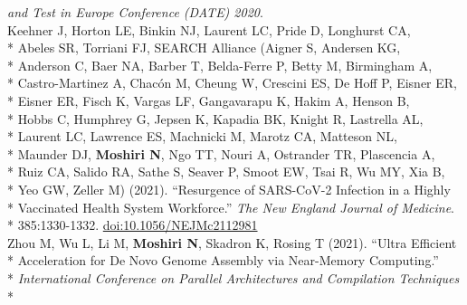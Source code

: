 \documentclass[margin,line]{res}
\begin{document}
\begin{resume}
\hspace*{8mm} \textit{and Test in Europe Conference (DATE) 2020}.\\
\hspace*{4mm} Keehner J, Horton LE, Binkin NJ, Laurent LC, Pride D, Longhurst CA,\\*
\hspace*{9mm} Abeles SR, Torriani FJ, SEARCH Alliance (Aigner S, Andersen KG,\\*
\hspace*{9mm} Anderson C, Baer NA, Barber T, Belda-Ferre P, Betty M, Birmingham A,\\*
\hspace*{9mm} Castro-Martinez A, Chac\'on M, Cheung W, Crescini ES, De Hoff P, Eisner ER,\\*
\hspace*{9mm} Eisner ER, Fisch K, Vargas LF, Gangavarapu K, Hakim A, Henson B,\\*
\hspace*{9mm} Hobbs C, Humphrey G, Jepsen K, Kapadia BK, Knight R, Lastrella AL,\\*
\hspace*{9mm} Laurent LC, Lawrence ES, Machnicki M, Marotz CA, Matteson NL,\\*
\hspace*{9mm} Maunder DJ, \textbf{Moshiri N}, Ngo TT, Nouri A, Ostrander TR, Plascencia A,\\*
\hspace*{9mm} Ruiz CA, Salido RA, Sathe S, Seaver P, Smoot EW, Tsai R, Wu MY, Xia B,\\*
\hspace*{9mm} Yeo GW, Zeller M) (2021). ``Resurgence of SARS-CoV-2 Infection in a Highly\\*
\hspace*{9mm} Vaccinated Health System Workforce.'' \textit{The New England Journal of Medicine}.\\*\vspace{2mm}
\hspace*{8mm} 385:1330-1332. \href{https://doi.org/10.1056/NEJMc2112981}{doi:10.1056/NEJMc2112981}\\
\hspace*{4mm} Zhou M, Wu L, Li M, \textbf{Moshiri N}, Skadron K, Rosing T (2021). ``Ultra Efficient\\*
\hspace*{9mm} Acceleration for De Novo Genome Assembly via Near-Memory Computing.''\\*
\hspace*{9mm} \textit{International Conference on Parallel Architectures and Compilation Techniques}\\*\vspace{2mm}

\end{resume}
\end{document}
